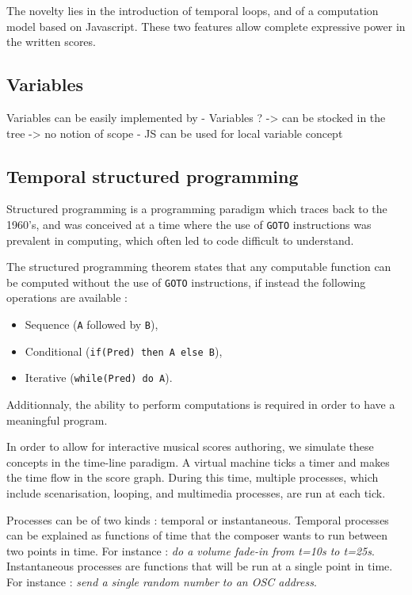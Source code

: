 \documentclass{article}
\begin{document}
The novelty lies in the introduction of temporal loops, and of a computation model 
based on Javascript. These two features allow complete expressive power in the 
written scores.

\subsection{Variables}
Variables can be easily implemented by 
- Variables ? 
-> can be stocked in the tree
-> no notion of scope
- JS can be used for local variable concept
\subsection{Temporal structured programming}
Structured programming is a programming paradigm which traces 
back to the 1960's, and was conceived at a time where the use of \verb|GOTO|
instructions was prevalent in computing, which often led to code difficult to understand.

The structured programming theorem\cite{bohm1966flow,mills1972mathematical} states that any computable function can be computed 
without the use of \verb|GOTO| instructions, if instead the following operations are available : 
\begin{itemize}
    \item Sequence (\verb|A| followed by \verb|B|), 
    \item Conditional (\verb|if(Pred) then A else B|), 
    \item Iterative (\verb|while(Pred) do A|).
\end{itemize}

Additionnaly, the ability to perform computations is required in order to have a meaningful program.

In order to allow for interactive musical scores authoring, we simulate these concepts in the time-line paradigm.
A virtual machine ticks a timer and makes the time flow in the score graph. 
During this time, multiple processes, which include scenarisation, looping, and multimedia processes, are 
run at each tick. 

Processes can be of two kinds : temporal or instantaneous.
Temporal processes can be explained as functions of time that the composer wants to run between 
two points in time. 
For instance : \emph{do a volume fade-in from t=10s to t=25s}.~\\
Instantaneous processes are functions that will be run at a single point in time.
For instance : \emph{send a single random number to an OSC address}.
\end{document}
